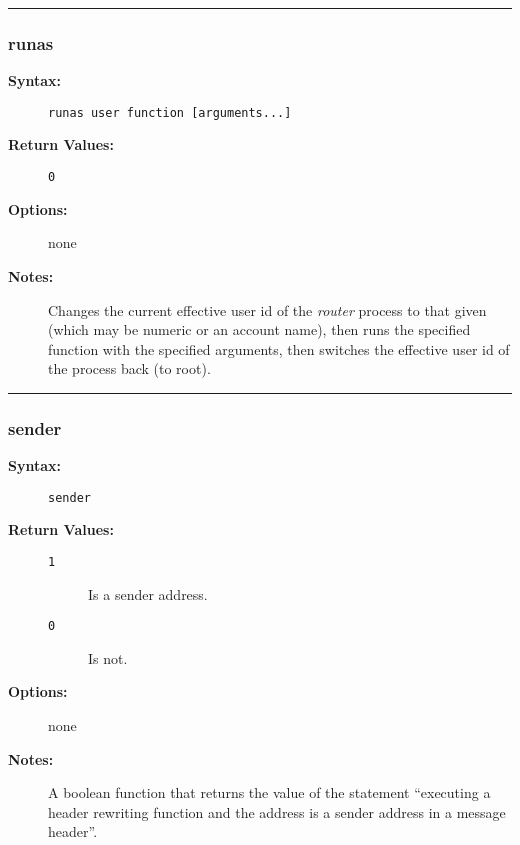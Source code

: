 \hrule
\subsubsection{runas}

\begin{description}
\item[{\bf Syntax:}] \mbox{}

{\tt runas user function [arguments...]}

\item[{\bf Return Values:}] \mbox{}

\begin{description}
\item[{\tt 0}] \mbox{}



\end{description}


\item[{\bf Options:}] \mbox{}

none  

\item[{\bf Notes:}] \mbox{}

Changes the current effective user id 
of the {\em router} process to that given (which may be 
numeric or an account name), then runs the specified function 
with the specified arguments, then switches the effective 
user id of the process back (to root). 

\end{description}


\hrule
\subsubsection{sender}

\begin{description}
\item[{\bf Syntax:}] \mbox{}

{\tt sender}

\item[{\bf Return Values:}] \mbox{}

\begin{description}
\item[{\tt 1}] \mbox{}

Is a sender address.

\item[{\tt 0}] \mbox{}

Is not.

\end{description}


\item[{\bf Options:}] \mbox{}

none  

\item[{\bf Notes:}] \mbox{}

A boolean function that returns the value of 
the statement ``executing a header rewriting function and the address 
is a sender address in a message header''. 

\end{description}


